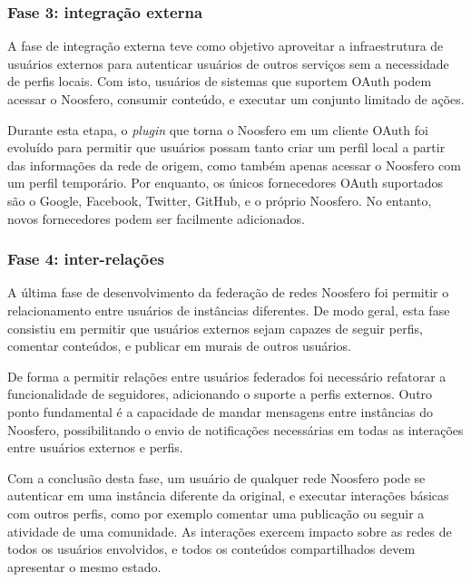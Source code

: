 \subsubsection{Fase 3: integração externa}

A fase de integração externa teve como objetivo aproveitar a infraestrutura de
usuários externos para autenticar usuários de outros serviços sem a necessidade de
perfis locais. Com isto, usuários de sistemas que suportem OAuth podem acessar o
Noosfero, consumir conteúdo, e executar um conjunto limitado de ações.

Durante esta etapa, o \textit{plugin} que torna o Noosfero em um cliente OAuth foi
evoluído para permitir que usuários possam tanto criar um perfil local a partir das
informações da rede de origem, como também apenas acessar o Noosfero com um perfil
temporário. Por enquanto, os únicos fornecedores OAuth suportados são o Google,
Facebook, Twitter, GitHub, e o próprio Noosfero. No entanto, novos fornecedores
podem ser facilmente adicionados.

\subsubsection{Fase 4: inter-relações}

A última fase de desenvolvimento da federação de redes Noosfero foi permitir o
relacionamento entre usuários de instâncias diferentes. De modo geral, esta fase
consistiu em permitir que usuários externos sejam capazes de seguir perfis, comentar
conteúdos, e publicar em murais de outros usuários.


De forma a permitir relações entre usuários federados foi necessário refatorar a
funcionalidade de seguidores, adicionando o suporte a perfis externos. Outro ponto
fundamental é a capacidade de mandar mensagens entre instâncias do Noosfero,
possibilitando o envio de notificações necessárias em todas as interações entre
usuários externos e perfis.


Com a conclusão desta fase, um usuário de qualquer rede Noosfero pode se autenticar
em uma instância diferente da original, e executar interações básicas com outros
perfis, como por exemplo comentar uma publicação ou seguir a atividade de uma
comunidade. As interações exercem impacto sobre as redes de todos os usuários
envolvidos, e todos os conteúdos compartilhados devem apresentar o mesmo estado.


